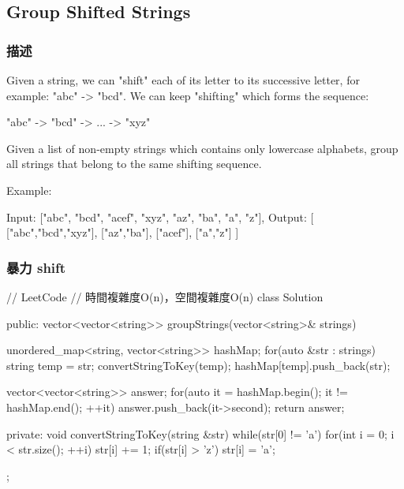\subsection{Group Shifted Strings}
\label{sec:group-shifted-strings}

\subsubsection{描述}
Given a string, we can "shift" each of its letter to its successive letter, for example: "abc" -> "bcd". We can keep "shifting" which forms the sequence:

\begin{Code}
"abc" -> "bcd" -> ... -> "xyz"
\end{Code}

Given a list of non-empty strings which contains only lowercase alphabets, group all strings that belong to the same shifting sequence.

Example:
\begin{Code}
Input: ["abc", "bcd", "acef", "xyz", "az", "ba", "a", "z"],
Output: 
[
  ["abc","bcd","xyz"],
  ["az","ba"],
  ["acef"],
  ["a","z"]
]
\end{Code}

\subsubsection{暴力 shift}
\begin{Code}
// LeetCode
// 時間複雜度O(n)，空間複雜度O(n)
class Solution {
public:
    vector<vector<string>> groupStrings(vector<string>& strings) {
        unordered_map<string, vector<string>> hashMap;
        for(auto &str : strings) {
            string temp = str;
            convertStringToKey(temp);
            hashMap[temp].push_back(str);
        }

        vector<vector<string>> answer;
        for(auto it = hashMap.begin(); it != hashMap.end(); ++it) {
            answer.push_back(it->second);
        }
        return answer;
    }
private:
    void convertStringToKey(string &str) {
        while(str[0] != 'a') {
            for(int i = 0; i < str.size(); ++i) {
                str[i] += 1;
                if(str[i] > 'z') {
                    str[i] = 'a';
                }
            }
        }
    }
};
\end{Code}

